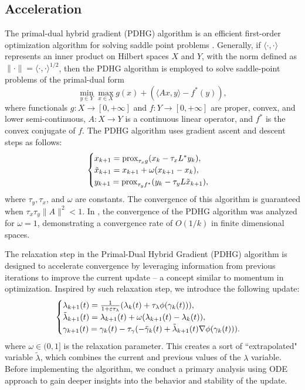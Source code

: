 \documentclass[12pt]{amsart}
\def\blue{\textcolor{blue}}
\theoremstyle{definition}
\theoremstyle{remark}
\numberwithin{equation}{section}
\numberwithin{equation}{section}
\begin{document}
\subsection{Acceleration}\label{sec:acceleration}
The primal-dual hybrid gradient (PDHG) algorithm is an efficient first-order optimization algorithm for solving saddle point problems \cite{Chambolle:2011}. Generally,  if $\langle \cdot, \cdot \rangle$ represents  an inner product on Hilbert spaces $X$ and $Y$,  with the norm defined as $\|\cdot \| = \langle \cdot, \cdot \rangle ^{1/2}$, then the PDHG algorithm is employed to solve saddle-point problems of the primal-dual form 
\[\min_{y\in Y}\max_{x\in X}  g(x) + \left(\langle Ax, y\rangle - f^*(y)\right),
\]
where functionals $g:X\to [0,+\infty]$ and $f:Y\to [0,+\infty]$ are proper, convex, and lower semi-continuous, $A:X\to Y$ is a continuous linear operator, and $f^*$ is the convex conjugate of $f$.
The PDHG algorithm uses gradient ascent and descent steps as follows:
\[\begin{cases}
    x_{k+1} = \text{prox}_{\tau_x g}(x_{k} - \tau_x L^*y_{k}), \\
    \Tilde{x}_{k+1} = x_{k+1}+ \omega(x_{k+1} -x_k),\\
    y_{k+1} = \text{prox}_{\tau_y f^*}(y_{k} - \tau_y L\Tilde{x}_{k+1}),
\end{cases}\]
where $\tau_y,\tau_x$, and $\omega$ are constants. 
The convergence of this algorithm is guaranteed when $\tau_x\tau_y\|A\|^2 <1$. In \cite{Chambolle:2011}
, the convergence of the PDHG algorithm was analyzed for $\omega = 1$, demonstrating a convergence rate of $O(1/k)$ in finite dimensional spaces.

The relaxation step in the Primal-Dual Hybrid Gradient (PDHG) algorithm is designed to accelerate convergence by leveraging information from previous iterations to improve the current update -- a concept similar to momentum in optimization. Inspired by such relaxation step, we introduce the following update: 
\begin{equation}\label{eqs:PDHG_update}
\begin{cases}
    \lambda_{k+1}(t) = \frac{1}{1+\varepsilon\tau_{\lambda}}(\lambda_k(t)+\tau_{\lambda}\phi(\gamma_{k}(t))), \\
    \Tilde{\lambda}_{k+1}(t) = \lambda_{k+1}(t)+ \omega(\lambda_{k+1}(t)-\lambda_k(t)),\\
    \gamma_{k+1}(t) = \gamma_k(t) - \tau_{\gamma}(-\ddot{\gamma}_k(t)+\Tilde{\lambda}_{k+1}(t)\nabla\phi(\gamma_k(t))).
\end{cases}\end{equation}
where $\omega \in (0, 1]$ is the relaxation parameter. This creates a sort of ``extrapolated" variable $\tilde \lambda$, which combines the current and previous values of the $\lambda$ variable. Before implementing the algorithm, we conduct a primary analysis using ODE approach to gain deeper insights into the behavior and stability of the update.
\end{document}

